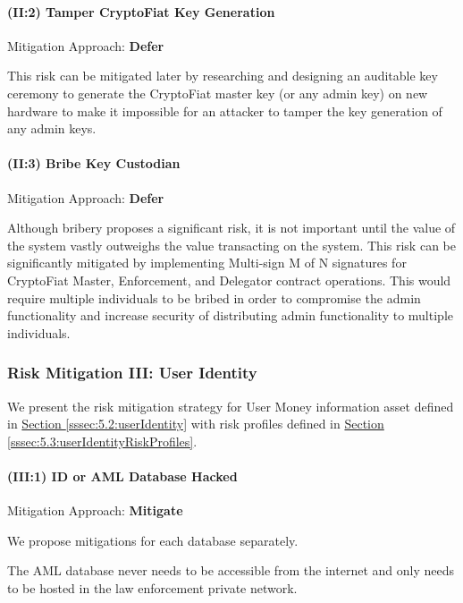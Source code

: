 \documentclass[a4paper,12pt]{article} %
\newcommand{\hypersectionref}[1]{\hyperref[#1]{Section \ref{#1}}}
\begin{document}
{\paragraph{(II:2) Tamper CryptoFiat Key Generation}

Mitigation Approach: \textbf{Defer}

This risk can be mitigated later by researching and designing an auditable key ceremony to generate the CryptoFiat master key (or any admin key) on new hardware to make it impossible for an attacker to tamper the key generation of any admin keys.

\paragraph{(II:3) Bribe Key Custodian}

Mitigation Approach: \textbf{Defer}

Although bribery proposes a significant risk, it is not important until the value of the system vastly outweighs the value transacting on the system. This risk can be significantly mitigated by implementing Multi-sign M of N signatures for CryptoFiat Master, Enforcement, and Delegator contract operations. This would require multiple individuals to be bribed in order to compromise the admin functionality and increase security of distributing admin functionality to multiple individuals.

\subsubsection{Risk Mitigation III: User Identity} \label{sssec:5.4:riskMitigationUserIdentity}

We present the risk mitigation strategy for User Money information asset defined in \hypersectionref{sssec:5.2:userIdentity} with risk profiles defined in \hypersectionref{sssec:5.3:userIdentityRiskProfiles}.

\paragraph{(III:1) ID or AML Database Hacked}

Mitigation Approach: \textbf{Mitigate}

We propose mitigations for each database separately.

The AML database never needs to be accessible from the internet and only needs to be hosted in the law enforcement private network.

}
\end{document}
